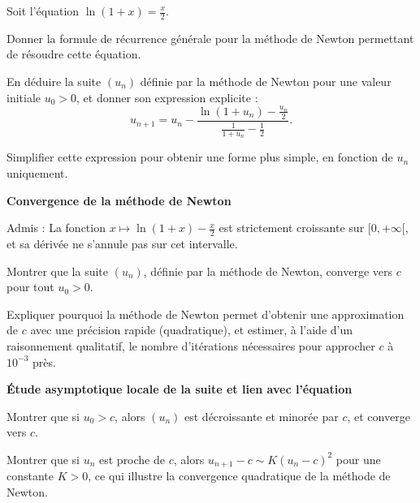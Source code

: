 \documentclass[10pt,a4paper]{article}
\begin{document}
Soit l'équation \( \ln(1+x) = \frac{x}{2} \).

\q Donner la formule de récurrence générale pour la méthode de Newton permettant de résoudre cette
équation.

\q En déduire la suite \( (u_n) \) définie par la méthode de Newton pour une valeur initiale \( u_0
> 0 \), et donner son expression explicite :
\[
u_{n+1} = u_n - \frac{\ln(1+u_n) - \frac{u_n}{2}}{\frac{1}{1+u_n} - \frac{1}{2}}.
\]

\q Simplifier cette expression pour obtenir une forme plus simple, en fonction de \( u_n \)
uniquement.

\vspace{0.5cm}
\textbf{Convergence de la méthode de Newton}

Admis : La fonction \( x \mapsto \ln(1+x) - \frac{x}{2} \) est strictement croissante sur \( [0,
+\infty[ \), et sa dérivée ne s'annule pas sur cet intervalle.

\q Montrer que la suite \( (u_n) \), définie par la méthode de Newton, converge vers \( c \) pour
tout \( u_0 > 0 \).

\q Expliquer pourquoi la méthode de Newton permet d'obtenir une approximation de \( c \) avec une
précision rapide (quadratique), et estimer, à l'aide d'un raisonnement qualitatif, le nombre
d'itérations nécessaires pour approcher \( c \) à \( 10^{-3} \) près.

\vspace{0.5cm}
\textbf{Étude asymptotique locale de la suite et lien avec l'équation}

\q Montrer que si \( u_0 > c \), alors \( (u_n) \) est décroissante et minorée par \( c \), et
converge vers \( c \).

\q Montrer que si \( u_n \) est proche de \( c \), alors \( u_{n+1} - c \sim K (u_n - c)^2 \) pour
une constante \( K > 0 \), ce qui illustre la convergence quadratique de la méthode de Newton.
\end{document}

